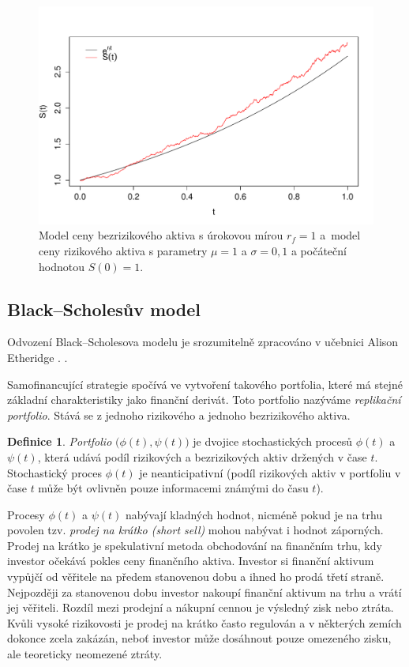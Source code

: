 \documentclass[a4paper,12pt]{report}
\theoremstyle{definition} \newtheorem{definice}[veta]{Definice}
\theoremstyle{remark}
\begin{document}
\begin{figure}[!htbp]
  \centering 
	\includegraphics[width=13.5cm, clip, trim= 0 15 25 50]{IMG/GWP_RFA_v4.pdf}
  \caption{Model ceny bezrizikového aktiva s úrokovou mírou $r_f=1$ a~model ceny rizikového aktiva s parametry $\mu=1$ a  $\sigma=0,1$ a počáteční hodnotou $S(0)=1$.}  \label{asset_model_graf}
\end{figure}

\subsection{Black–Scholesův model}
Odvození Black–Scholesova modelu je srozumitelně zpracováno v učebnici Alison Etheridge \cite{etheridge2002course}.
 \cite{baxter1996financial}.

Samofinancující strategie spočívá ve vytvoření takového portfolia, které má stejné základní charakteristiky jako finanční derivát. 
Toto portfolio nazýváme \textit{replikační portfolio}.
Stává se z jednoho rizikového a jednoho bezrizikového aktiva.

\begin{definice}
\textit{Portfolio} $\big(\phi(t),\psi(t)\big)$ je dvojice stochastických procesů $\phi(t)$ a $\psi(t)$, která udává podíl rizikových a bezrizikových aktiv držených v čase $t$.
Stochastický proces $\phi(t)$ je neanticipativní (podíl rizikových aktiv v portfoliu v čase $t$ může být ovlivněn pouze informacemi známými do času $t$).
\end{definice}
Procesy $\phi(t)$ a $\psi(t)$ nabývají kladných hodnot, nicméně pokud je na trhu povolen tzv. \textit{prodej na krátko (short sell)} mohou nabývat i hodnot záporných.
Prodej na krátko je spekulativní metoda obchodování na finančním trhu, kdy investor očekává pokles ceny finančního aktiva.
Investor si finanční aktivum vypůjčí od věřitele na předem stanovenou dobu a ihned ho prodá třetí straně.
Nejpozději za stanovenou dobu investor nakoupí finanční aktivum na trhu a vrátí jej věřiteli.
Rozdíl mezi prodejní a nákupní cennou je výsledný zisk nebo ztráta.
Kvůli vysoké rizikovosti je prodej na krátko často regulován a v některých zemích dokonce zcela zakázán, neboť investor může dosáhnout pouze omezeného zisku, ale teoreticky neomezené ztráty.
\end{document}
